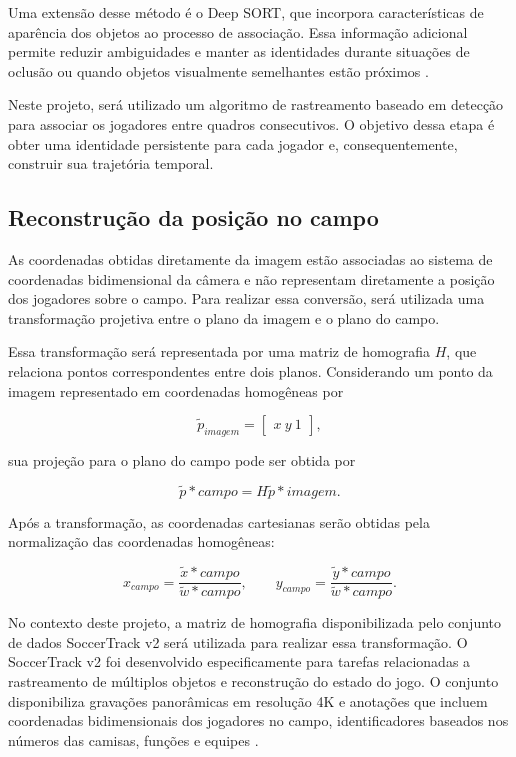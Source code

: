 Uma extensão desse método é o Deep SORT, que incorpora características de aparência dos objetos ao processo de associação. Essa informação adicional permite reduzir ambiguidades e manter as identidades durante situações de oclusão ou quando objetos visualmente semelhantes estão próximos \cite{wojke2017deepsort}.

Neste projeto, será utilizado um algoritmo de rastreamento baseado em detecção para associar os jogadores entre quadros consecutivos. O objetivo dessa etapa é obter uma identidade persistente para cada jogador e, consequentemente, construir sua trajetória temporal.

\subsection{Reconstrução da posição no campo}

As coordenadas obtidas diretamente da imagem estão associadas ao sistema de coordenadas bidimensional da câmera e não representam diretamente a posição dos jogadores sobre o campo. Para realizar essa conversão, será utilizada uma transformação projetiva entre o plano da imagem e o plano do campo.

Essa transformação será representada por uma matriz de homografia $H$, que relaciona pontos correspondentes entre dois planos. Considerando um ponto da imagem representado em coordenadas homogêneas por

\begin{equation}
\tilde{p}_{imagem} =
\begin{bmatrix}
x \
y \
1
\end{bmatrix},
\end{equation}

sua projeção para o plano do campo pode ser obtida por

\begin{equation}
\tilde{p}*{campo} =
H\tilde{p}*{imagem}.
\end{equation}

Após a transformação, as coordenadas cartesianas serão obtidas pela normalização das coordenadas homogêneas:

\begin{equation}
x_{campo} =
\frac{\tilde{x}*{campo}}
{\tilde{w}*{campo}},
\qquad
y_{campo} =
\frac{\tilde{y}*{campo}}
{\tilde{w}*{campo}}.
\end{equation}

No contexto deste projeto, a matriz de homografia disponibilizada pelo conjunto de dados SoccerTrack v2 será utilizada para realizar essa transformação. O SoccerTrack v2 foi desenvolvido especificamente para tarefas relacionadas a rastreamento de múltiplos objetos e reconstrução do estado do jogo. O conjunto disponibiliza gravações panorâmicas em resolução 4K e anotações que incluem coordenadas bidimensionais dos jogadores no campo, identificadores baseados nos números das camisas, funções e equipes \cite{scott2025soccertrackv2}.

